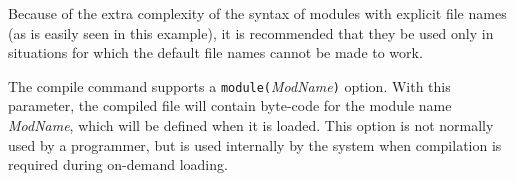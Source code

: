 Because of the extra complexity of the syntax of modules with explicit
file names (as is easily seen in this example), it is recommended that
they be used only in situations for which the default file names
cannot be made to work.

The compile command supports a {\tt module(}{\em ModName}{\tt )}
option.  With this parameter, the compiled file will contain byte-code
for the module name {\em ModName}, which will be defined when it is
loaded.  This option is not normally used by a programmer, but is used
internally by the system when compilation is required during on-demand
loading.

